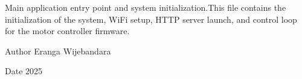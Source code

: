 Main application entry point and system initialization.\+This file contains the initialization of the system, Wi\+Fi setup, HTTP server launch, and control loop for the motor controller firmware.

\begin{DoxyAuthor}{Author}
Eranga Wijebandara 
\end{DoxyAuthor}
\begin{DoxyDate}{Date}
2025 
\end{DoxyDate}
